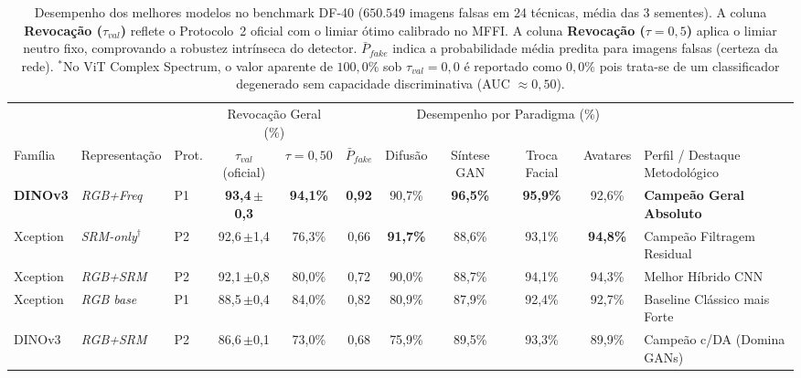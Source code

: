 \providecommand{\pmsd}[2]{#1\,{\scriptsize$\pm$#2}}

\begin{table}[!t]
\centering
\caption{Desempenho dos melhores modelos no benchmark DF-40 ($650.549$ imagens falsas em 24 técnicas, média das 3 sementes).
A coluna \textbf{Revocação ($\tau_{val}$)} reflete o Protocolo~2 oficial com o limiar ótimo calibrado no MFFI.
A coluna \textbf{Revocação ($\tau=0{,}5$)} aplica o limiar neutro fixo, comprovando a robustez intrínseca do detector.
$\bar{P}_{fake}$ indica a probabilidade média predita para imagens falsas (certeza da rede).
$^*$No ViT Complex Spectrum, o valor aparente de $100{,}0\%$ sob $\tau_{val}=0{,}0$ é reportado como $0{,}0\%$ pois trata-se de um classificador degenerado sem capacidade discriminativa (AUC $\approx 0{,}50$).}
\label{tab:df40_melhores_modelos}
\vspace{-2mm}
\scriptsize\renewcommand{\arraystretch}{0.92}
\setlength{\tabcolsep}{3.5pt}
\begin{tabular}{@{}lll cc c cccc l@{}}
\toprule
 & & & \multicolumn{2}{c}{Revocação Geral (\%)} & & \multicolumn{4}{c}{Desempenho por Paradigma (\%)} & \\
\cmidrule(lr){4-5}\cmidrule(lr){7-10}
Família & Representação & Prot. & $\tau_{val}$ (oficial) & $\tau=0{,}50$ & $\bar{P}_{fake}$ & Difusão & Síntese GAN & Troca Facial & Avatares & Perfil / Destaque Metodológico \\
\midrule
\textbf{DINOv3} & \textit{RGB+Freq} & P1 & \textbf{\pmsd{93,4}{0,3}} & \textbf{94,1\%} & \textbf{0,92} & 90,7\% & \textbf{96,5\%} & \textbf{95,9\%} & 92,6\% & \textbf{Campeão Geral Absoluto} \\
Xception & \textit{SRM-only}$^\dagger$ & P2 & \pmsd{92,6}{1,4} & 76,3\% & 0,66 & \textbf{91,7\%} & 88,6\% & 93,1\% & \textbf{94,8\%} & Campeão Filtragem Residual \\
Xception & \textit{RGB+SRM} & P2 & \pmsd{92,1}{0,8} & 80,0\% & 0,72 & 90,0\% & 88,7\% & 94,1\% & 94,3\% & Melhor Híbrido CNN \\
Xception & \textit{RGB base} & P1 & \pmsd{88,5}{0,4} & 84,0\% & 0,82 & 80,9\% & 87,9\% & 92,4\% & 92,7\% & Baseline Clássico mais Forte \\
DINOv3 & \textit{RGB+SRM} & P2 & \pmsd{86,6}{0,1} & 73,0\% & 0,68 & 75,9\% & 89,5\% & 93,3\% & 89,9\% & Campeão c/DA (Domina GANs) \\

\end{tabular}
\end{table}
